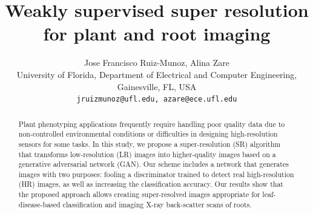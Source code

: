 \documentclass[10pt,twocolumn,letterpaper]{article}
\begin{document}
\title{Weakly supervised super resolution for plant and root imaging}

\author{Jose Francisco Ruiz-Munoz, Alina Zare \\
University of Florida, Department of Electrical and Computer Engineering, Gainesville, FL, USA\\
{\tt\small jruizmunoz@ufl.edu, azare@ece.ufl.edu}
}

\maketitle

\begin{abstract}
   Plant phenotyping applications frequently require handling poor quality data due to non-controlled environmental conditions or difficulties in designing high-resolution sensors for some tasks. In this study, we propose a super-resolution (SR) algorithm that transforms low-resolution (LR) images into higher-quality images based on a generative adversarial network (GAN). Our scheme includes a network that generates images with two purposes: fooling a discriminator trained to detect real high-resolution (HR) images, as well as increasing the classification accuracy. Our results show that the proposed approach allows creating super-resolved images appropriate for leaf-disease-based classification and imaging X-ray back-scatter scans of roots.
\end{abstract}

\end{document}
